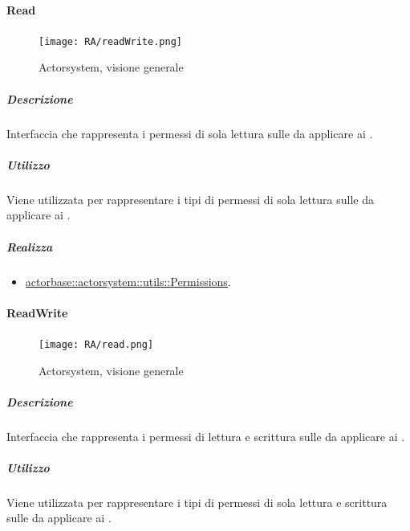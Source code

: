 \documentclass{scalatekids-article}
\begin{document}

\paragraph{Read}
\label{sec:actorbase::actorsystem::utils::Read}

\begin{figure}[H]
  \begin{center}
    \texttt{[image: RA/readWrite.png]}
    \caption{Actorsystem, visione generale}
  \end{center}
\end{figure}

\subparagraph{Descrizione}

Interfaccia che rappresenta i permessi di sola lettura sulle 
da applicare ai .

\subparagraph{Utilizzo}

Viene utilizzata per rappresentare i tipi di permessi di sola lettura sulle
 da applicare ai .

\subparagraph{Realizza}

\begin{itemize}
\item \hyperref[sec:actorbase::actorsystem::utils::Read]{actorbase::actorsystem::utils::Permissions}.
\end{itemize}

\paragraph{ReadWrite}
\label{sec:actorbase::actorsystem::utils::ReadWrite}

\begin{figure}[H]
  \begin{center}
    \texttt{[image: RA/read.png]}
    \caption{Actorsystem, visione generale}
  \end{center}
\end{figure}

\subparagraph{Descrizione}

Interfaccia che rappresenta i permessi di lettura e scrittura sulle
 da applicare ai .

\subparagraph{Utilizzo}

Viene utilizzata per rappresentare i tipi di permessi di sola lettura e
scrittura sulle  da applicare ai .
\end{document}
